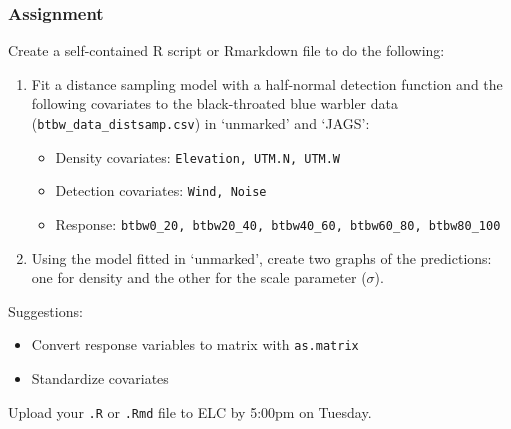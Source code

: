 \documentclass[color=usenames,dvipsnames]{beamer}\usepackage[]{graphicx}\usepackage[]{xcolor}
\newcommand{\inr}[1]{\colorbox{inlinecolor}{\texttt{#1}}}
\begin{document}
\begin{frame}[fragile]
  \frametitle{Assignment}
  \footnotesize
  Create a self-contained R script or Rmarkdown file to do the following:
  \vfill
  \begin{enumerate}
    \footnotesize
    \item Fit a distance sampling model with a half-normal detection
      function and the following covariates to the black-throated blue
      warbler data ({\tt btbw\_data\_distsamp.csv}) in `unmarked' and
      `JAGS':   
      \begin{itemize}
        \footnotesize
        \item Density covariates: {\tt Elevation, UTM.N, UTM.W}
        \item Detection covariates: {\tt Wind, Noise}
        \item Response: {\scriptsize \tt btbw0\_20, btbw20\_40, btbw40\_60, btbw60\_80, btbw80\_100}
      \end{itemize}
    \item Using the model fitted in `unmarked', create two graphs of
      the predictions: one for density and the other for the scale
      parameter ($\sigma$).
  \end{enumerate}
  \vfill
  Suggestions:
  \begin{itemize}
    \item Convert response variables to matrix with \inr{as.matrix}
    \item Standardize covariates
  \end{itemize}
  \vfill
  Upload your {\tt .R} or {\tt .Rmd} file to ELC by 5:00pm on Tuesday. 
\end{frame}
\end{document}
